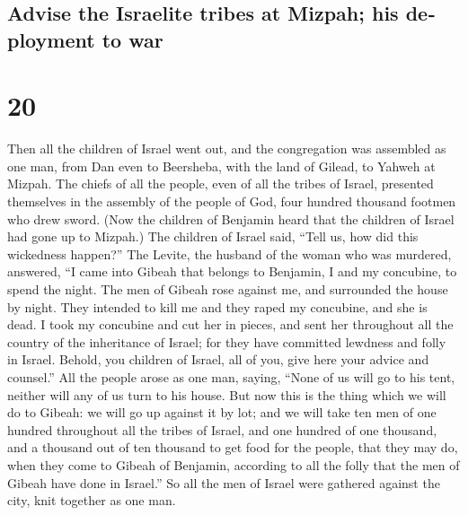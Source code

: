 \begin{paracol}{2}
\switchcolumn
\begin{otherlanguage}{english}

\hypertarget{advise-the-israelite-tribes-at-mizpah-his-deployment-to-war}{%
\subsection{Advise the Israelite tribes at Mizpah; his deployment to
war}\label{advise-the-israelite-tribes-at-mizpah-his-deployment-to-war}}

\hypertarget{section-39}{%
\section{20}\label{section-39}}

 Then all the children of Israel went out, and the
congregation was assembled as one man, from Dan even to Beersheba, with
the land of Gilead, to Yahweh at Mizpah.  The chiefs of
all the people, even of all the tribes of Israel, presented themselves
in the assembly of the people of God, four hundred thousand footmen who
drew sword.  (Now the children of Benjamin heard that the
children of Israel had gone up to Mizpah.) The children of Israel said,
``Tell us, how did this wickedness happen?''  The Levite,
the husband of the woman who was murdered, answered, ``I came into
Gibeah that belongs to Benjamin, I and my concubine, to spend the night.
 The men of Gibeah rose against me, and surrounded the
house by night. They intended to kill me and they raped my concubine,
and she is dead.  I took my concubine and cut her in
pieces, and sent her throughout all the country of the inheritance of
Israel; for they have committed lewdness and folly in Israel.
 Behold, you children of Israel, all of you, give here
your advice and counsel.''  All the people arose as one
man, saying, ``None of us will go to his tent, neither will any of us
turn to his house.  But now this is the thing which we
will do to Gibeah: we will go up against it by lot;  and
we will take ten men of one hundred throughout all the tribes of Israel,
and one hundred of one thousand, and a thousand out of ten thousand to
get food for the people, that they may do, when they come to Gibeah of
Benjamin, according to all the folly that the men of Gibeah have done in
Israel.''  So all the men of Israel were gathered against
the city, knit together as one man.


\end{otherlanguage}
\end{paracol}
